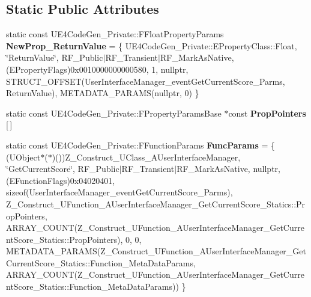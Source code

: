 \subsection*{Static Public Attributes}
\begin{DoxyCompactItemize}
\item 
\mbox{\label{struct_z___construct___u_function___a_user_interface_manager___get_current_score___statics_a74ec3047a35cfa6e7bef55ba53c1332d}} 
static const U\+E4\+Code\+Gen\+\_\+\+Private\+::\+F\+Float\+Property\+Params {\bfseries New\+Prop\+\_\+\+Return\+Value} = \{ U\+E4\+Code\+Gen\+\_\+\+Private\+::\+E\+Property\+Class\+::\+Float, \char`\"{}Return\+Value\char`\"{}, R\+F\+\_\+\+Public$\vert$R\+F\+\_\+\+Transient$\vert$R\+F\+\_\+\+Mark\+As\+Native, (E\+Property\+Flags)0x0010000000000580, 1, nullptr, S\+T\+R\+U\+C\+T\+\_\+\+O\+F\+F\+S\+E\+T(\+User\+Interface\+Manager\+\_\+event\+Get\+Current\+Score\+\_\+\+Parms, Return\+Value), M\+E\+T\+A\+D\+A\+T\+A\+\_\+\+P\+A\+R\+A\+M\+S(nullptr, 0) \}
\item 
static const U\+E4\+Code\+Gen\+\_\+\+Private\+::\+F\+Property\+Params\+Base $\ast$const {\bfseries Prop\+Pointers} \mbox{[}$\,$\mbox{]}
\item 
\mbox{\label{struct_z___construct___u_function___a_user_interface_manager___get_current_score___statics_a8bcb1549378ae9d6b0d9fe8316456f7a}} 
static const U\+E4\+Code\+Gen\+\_\+\+Private\+::\+F\+Function\+Params {\bfseries Func\+Params} = \{ (U\+Object$\ast$($\ast$)())Z\+\_\+\+Construct\+\_\+\+U\+Class\+\_\+\+A\+User\+Interface\+Manager, \char`\"{}Get\+Current\+Score\char`\"{}, R\+F\+\_\+\+Public$\vert$R\+F\+\_\+\+Transient$\vert$R\+F\+\_\+\+Mark\+As\+Native, nullptr, (E\+Function\+Flags)0x04020401, sizeof(\+User\+Interface\+Manager\+\_\+event\+Get\+Current\+Score\+\_\+\+Parms), Z\+\_\+\+Construct\+\_\+\+U\+Function\+\_\+\+A\+User\+Interface\+Manager\+\_\+\+Get\+Current\+Score\+\_\+\+Statics\+::\+Prop\+Pointers, A\+R\+R\+A\+Y\+\_\+\+C\+O\+U\+N\+T(\+Z\+\_\+\+Construct\+\_\+\+U\+Function\+\_\+\+A\+User\+Interface\+Manager\+\_\+\+Get\+Current\+Score\+\_\+\+Statics\+::\+Prop\+Pointers), 0, 0, M\+E\+T\+A\+D\+A\+T\+A\+\_\+\+P\+A\+R\+A\+M\+S(\+Z\+\_\+\+Construct\+\_\+\+U\+Function\+\_\+\+A\+User\+Interface\+Manager\+\_\+\+Get\+Current\+Score\+\_\+\+Statics\+::\+Function\+\_\+\+Meta\+Data\+Params, A\+R\+R\+A\+Y\+\_\+\+C\+O\+U\+N\+T(\+Z\+\_\+\+Construct\+\_\+\+U\+Function\+\_\+\+A\+User\+Interface\+Manager\+\_\+\+Get\+Current\+Score\+\_\+\+Statics\+::\+Function\+\_\+\+Meta\+Data\+Params)) \}
\end{DoxyCompactItemize}


